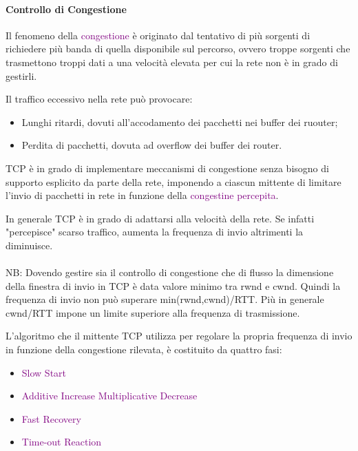 \newpage
\paragraph{Controllo di Congestione}

Il fenomeno della \textcolor{purple}{congestione} è originato dal tentativo di più sorgenti di richiedere più banda di quella disponibile sul percorso, ovvero troppe sorgenti che trasmettono troppi dati a una velocità elevata per cui la rete non è in grado di gestirli.

Il traffico eccessivo nella rete può provocare:
\begin{itemize}
    \item Lunghi ritardi, dovuti all'accodamento dei pacchetti nei buffer dei ruouter;
    \item Perdita di pacchetti, dovuta ad overflow dei buffer dei router.
\end{itemize}

TCP è in grado di implementare meccanismi di congestione senza bisogno di supporto esplicito da parte della rete, imponendo a ciascun mittente di limitare l'invio di pacchetti in rete in funzione della \textcolor{purple}{congestine percepita}. 

In generale TCP è in grado di adattarsi alla velocità della rete. 
Se infatti "percepisce" scarso traffico, aumenta la frequenza di invio altrimenti la diminuisce.
\\\\NB: Dovendo gestire sia il controllo di congestione che di flusso la dimensione della finestra di invio in TCP è data valore minimo tra rwnd e cwnd. 
Quindi la frequenza di invio non può superare min(rwnd,cwnd)/RTT. Più in generale cwnd/RTT impone un limite superiore alla frequenza di trasmissione.

L'algoritmo che il mittente TCP utilizza per regolare la propria frequenza di invio in funzione della congestione rilevata, è costituito da quattro fasi:
\begin{itemize}
    \item \textcolor{purple}{Slow Start}
    \item \textcolor{purple}{Additive Increase Multiplicative Decrease}
    \item \textcolor{purple}{Fast Recovery}
    \item \textcolor{purple}{Time-out Reaction}
\end{itemize}

